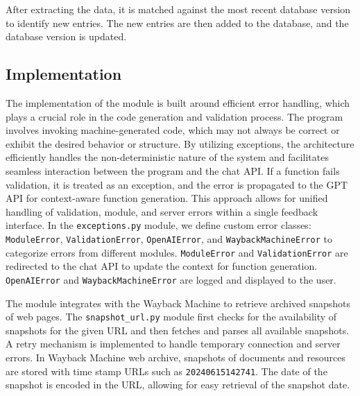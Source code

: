 \documentclass[11pt]{article}
\begin{document}
After extracting the data, it is matched against the most recent database version to identify new entries. The new entries are then added to the database, and the database version is updated.

\subsection{Implementation}


The implementation of the module is built around efficient error handling, which plays a crucial role in the code generation and validation process. The program involves invoking machine-generated code, which may not always be correct or exhibit the desired behavior or structure. By utilizing exceptions, the architecture efficiently handles the non-deterministic nature of the system and facilitates seamless interaction between the program and the chat API.
%
If a function fails validation, it is treated as an exception, and the error is propagated to the GPT API for context-aware function generation. This approach allows for unified handling of validation, module, and server errors within a single feedback interface.
%
In the \texttt{exceptions.py} module, we define custom error classes: \texttt{ModuleError}, \texttt{ValidationError}, \texttt{OpenAIError}, and \texttt{WaybackMachineError} to categorize errors from different modules. \texttt{ModuleError} and \texttt{ValidationError} are redirected to the chat API to update the context for function generation. \texttt{OpenAIError} and \texttt{WaybackMachineError} are logged and displayed to the user.


The module integrates with the Wayback Machine to retrieve archived snapshots of web pages. The \texttt{snapshot\_url.py} module first checks for the availability of snapshots for the given URL and then fetches and parses all available snapshots. A retry mechanism is implemented to handle temporary connection and server errors.
%
In Wayback Machine web archive, snapshots of documents and resources are stored with time stamp URLs such as \texttt{20240615142741}. The date of the snapshot is encoded in the URL, allowing for easy retrieval of the snapshot date.
\end{document}
